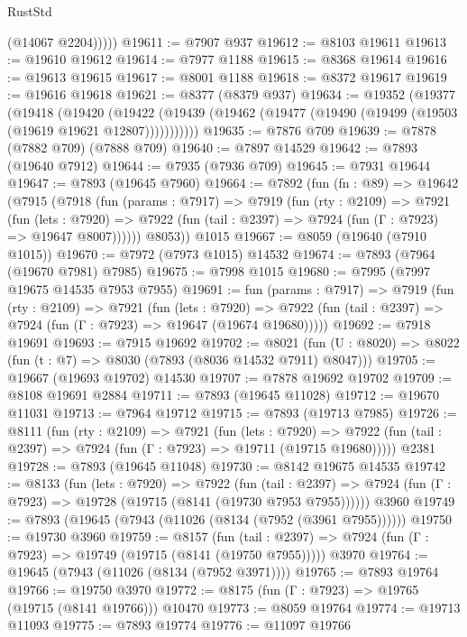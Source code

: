 \begin{lexlean}{RustStd}
\begin{coremodule}
            (@14067 @2204)))))
@19611 := @7907 @937
@19612 := @8103 @19611
@19613 := @19610 @19612
@19614 := @7977 @1188
@19615 := @8368 @19614
@19616 := @19613 @19615
@19617 := @8001 @1188
@19618 := @8372 @19617
@19619 := @19616 @19618
@19621 := @8377 (@8379 @937)
@19634 := @19352
    (@19377
      (@19418
        (@19420
          (@19422 (@19439 (@19462 (@19477 (@19490 (@19499 (@19503 (@19619 @19621 @12807)))))))))))
@19635 := @7876 @709
@19639 := @7878 (@7882 @709) (@7888 @709)
@19640 := @7897 @14529
@19642 := @7893 (@19640 @7912)
@19644 := @7935 (@7936 @709)
@19645 := @7931 @19644
@19647 := @7893 (@19645 @7960)
@19664 := @7892
    (fun (fn : @89) =>
    @19642
      (@7915
        (@7918
          (fun (params : @7917) =>
          @7919
            (fun (rty : @2109) =>
            @7921
              (fun (lets : @7920) =>
              @7922 (fun (tail : @2397) => @7924 (fun (Γ : @7923) => @19647 @8007))))))
        @8053))
    @1015
@19667 := @8059 (@19640 (@7910 @1015))
@19670 := @7972 (@7973 @1015) @14532
@19674 := @7893 (@7964 (@19670 @7981) @7985)
@19675 := @7998 @1015
@19680 := @7995 (@7997 @19675 @14535 @7953 @7955)
@19691 := fun (params : @7917) =>
  @7919
    (fun (rty : @2109) =>
    @7921
      (fun (lets : @7920) =>
      @7922 (fun (tail : @2397) => @7924 (fun (Γ : @7923) => @19647 (@19674 @19680)))))
@19692 := @7918 @19691
@19693 := @7915 @19692
@19702 := @8021
    (fun (U : @8020) => @8022 (fun (t : @7) => @8030 (@7893 (@8036 @14532 @7911) @8047)))
@19705 := @19667 (@19693 @19702) @14530
@19707 := @7878 @19692 @19702
@19709 := @8108 @19691 @2884
@19711 := @7893 (@19645 @11028)
@19712 := @19670 @11031
@19713 := @7964 @19712
@19715 := @7893 (@19713 @7985)
@19726 := @8111
    (fun (rty : @2109) =>
    @7921
      (fun (lets : @7920) =>
      @7922 (fun (tail : @2397) => @7924 (fun (Γ : @7923) => @19711 (@19715 @19680)))))
    @2381
@19728 := @7893 (@19645 @11048)
@19730 := @8142 @19675 @14535
@19742 := @8133
    (fun (lets : @7920) =>
    @7922
      (fun (tail : @2397) =>
      @7924 (fun (Γ : @7923) => @19728 (@19715 (@8141 (@19730 @7953 @7955))))))
    @3960
@19749 := @7893 (@19645 (@7943 (@11026 (@8134 (@7952 (@3961 @7955))))))
@19750 := @19730 @3960
@19759 := @8157
    (fun (tail : @2397) => @7924 (fun (Γ : @7923) => @19749 (@19715 (@8141 (@19750 @7955)))))
    @3970
@19764 := @19645 (@7943 (@11026 (@8134 (@7952 @3971))))
@19765 := @7893 @19764
@19766 := @19750 @3970
@19772 := @8175 (fun (Γ : @7923) => @19765 (@19715 (@8141 @19766))) @10470
@19773 := @8059 @19764
@19774 := @19713 @11093
@19775 := @7893 @19774
@19776 := @11097 @19766

\end{coremodule}
\end{lexlean}

